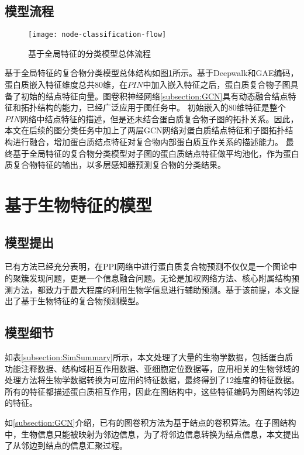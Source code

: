 \subsection{模型流程}
\label{subsection:Global:Modelflow}
\begin{figure}[htbp]
    \centering
    \texttt{[image: node-classification-flow]}
    \caption{基于全局特征的分类模型总体流程}
    \label{fig:node-classification-flow}
\end{figure}
基于全局特征的复合物分类模型总体结构如图\ref{fig:node-classification-flow}所示。基于Deepwalk和GAE编码，蛋白质嵌入特征维度总共80维，在$PIN$中加入嵌入特征之后，蛋白质复合物子图具备了初始的结点特征向量。图卷积神经网络\ref{subsection:GCN}具有动态融合结点特征和拓扑结构的能力，已经广泛应用于图任务中。
初始嵌入的80维特征是整个$PIN$网络中结点特征的描述，但是还未结合蛋白质复合物子图的拓扑关系。因此，本文在后续的图分类任务中加上了两层GCN网络对蛋白质结点特征和子图拓扑结构进行融合，增加蛋白质结点特征对复合物内部蛋白质互作关系的描述能力。
最终基于全局特征的复合物分类模型对子图的蛋白质结点特征做平均池化，作为蛋白质复合物特征的输出，以多层感知器预测复合物的分类结果。


\section{基于生物特征的模型}
\label{section:biofeatBaseModel}
\subsection{模型提出}
\label{subsection:biofeat:Modelget}
已有方法已经充分表明，在PPI网络中进行蛋白质复合物预测不仅仅是一个图论中的聚簇发现问题，更是一个信息融合问题。无论是加权网络方法、核心附属结构预测方法，都致力于最大程度的利用生物学信息进行辅助预测。基于该前提，本文提出了基于生物特征的复合物预测模型。
\subsection{模型细节}
\label{subsection:biofeat:Modeldetail}
如表\ref{subsection:SimSummary}所示，本文处理了大量的生物学数据，包括蛋白质功能注释数据、结构域相互作用数据、亚细胞定位数据等，应用相关的生物邻域的处理方法将生物学数据转换为可应用的特征数据，最终得到了12维度的特征数据。所有的特征都描述蛋白质相互作用，因此在图结构中，这些特征编码为图结构邻边的特征。

如\ref{subsection:GCN}介绍，已有的图卷积方法为基于结点的卷积算法。在子图结构中，生物信息只能被映射为邻边信息，为了将邻边信息转换为结点信息，本文提出了从邻边到结点的信息汇聚过程。

